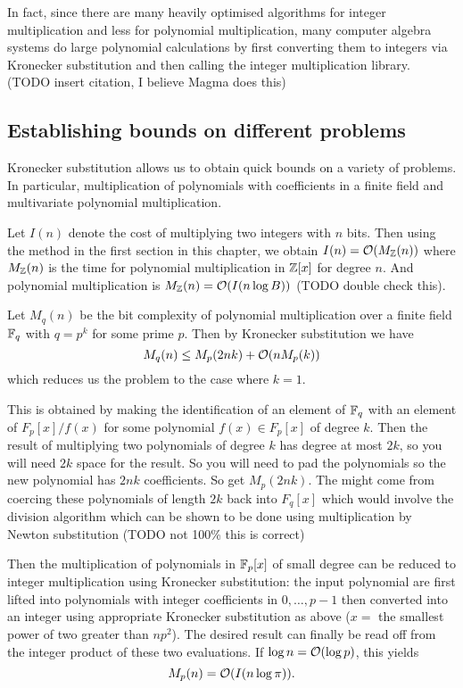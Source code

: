 In fact, since there are many heavily optimised algorithms for integer multiplication and less for polynomial multiplication, many computer algebra systems do large polynomial calculations by first converting them to integers via Kronecker substitution and then calling the integer multiplication library. (TODO insert citation, I believe Magma does this)

\subsection{Establishing bounds on different problems}%
\label{sub:Establishing bounds on different problems}

Kronecker substitution allows us to obtain quick bounds on a variety of problems. In particular, multiplication of polynomials with coefficients in a finite field and multivariate polynomial multiplication.

Let $I(n)$ denote the cost of multiplying two integers with $n$ bits. Then using the method in the first section in this chapter, we obtain $I(n) = \mathcal O(M_{\mathbb Z}(n))$ where $M_{\mathbb Z}(n)$ is the time for polynomial multiplication in ${\mathbb Z}[x]$ for degree $n$. And polynomial multiplication is $M_{\mathbb Z}(n) = \mathcal O(I(n\log B))$ (TODO double check this).

Let $M_q(n)$ be the bit complexity of polynomial multiplication over a finite field ${\mathbb F}_q$ with $q = p^k$ for some prime $p$. Then by Kronecker substitution we have
\[
    M_q(n) \leq M_p(2nk) + \mathcal O(n M_p(k))
\]
which reduces us the problem to the case where $k = 1$.

This is obtained by making the identification of an element of ${\mathbb F}_q$ with an element of $F_p[x]/f(x)$ for some polynomial $f(x) \in F_p[x]$ of degree $k$. Then the result of multiplying two polynomials of degree $k$ has degree at most $2k$, so you will need $2k$ space for the result. So you will need to pad the polynomials so the new polynomial has $2nk$ coefficients. So get $M_p(2nk)$. The might come from coercing these polynomials of length $2k$ back into $F_q[x]$ which would involve the division algorithm which can be shown to be done using multiplication by Newton substitution (TODO not 100\% this is correct)

Then the multiplication of polynomials in ${\mathbb F}_p[x]$ of small degree can be reduced to integer multiplication using Kronecker substitution: the input polynomial are first lifted into polynomials with integer coefficients in $0, \ldots, p - 1$ then converted into an integer using appropriate Kronecker substitution as above ($x =$ the smallest power of two greater than $n p^2$). The desired result can finally be read off from the integer product of these two evaluations. If $\log n = \mathcal O(\log p)$, this yields
\[
    M_p(n) = \mathcal O(I(n \log \pi)).
\]

